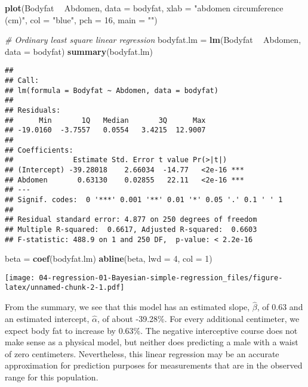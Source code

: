\documentclass[]{book}
\newenvironment{Shaded}{\begin{snugshade}}{\end{snugshade}}
\newcommand{\KeywordTok}[1]{\textcolor[rgb]{0.13,0.29,0.53}{\textbf{#1}}}
\newcommand{\DataTypeTok}[1]{\textcolor[rgb]{0.13,0.29,0.53}{#1}}
\newcommand{\DecValTok}[1]{\textcolor[rgb]{0.00,0.00,0.81}{#1}}
\newcommand{\StringTok}[1]{\textcolor[rgb]{0.31,0.60,0.02}{#1}}
\newcommand{\CommentTok}[1]{\textcolor[rgb]{0.56,0.35,0.01}{\textit{#1}}}
\newcommand{\OperatorTok}[1]{\textcolor[rgb]{0.81,0.36,0.00}{\textbf{#1}}}
\newcommand{\NormalTok}[1]{#1}
\theoremstyle{definition}
\theoremstyle{definition}
\theoremstyle{definition}
\theoremstyle{remark}
\begin{document}
\begin{Shaded}
\begin{Highlighting}[]
\KeywordTok{plot}\NormalTok{(Bodyfat }\OperatorTok{~}\StringTok{ }\NormalTok{Abdomen, }\DataTypeTok{data =}\NormalTok{ bodyfat, }
     \DataTypeTok{xlab =} \StringTok{"abdomen circumference (cm)"}\NormalTok{, }
     \DataTypeTok{col =} \StringTok{"blue"}\NormalTok{, }\DataTypeTok{pch =} \DecValTok{16}\NormalTok{, }\DataTypeTok{main =} \StringTok{""}\NormalTok{)}

\CommentTok{# Ordinary least square linear regression}
\NormalTok{bodyfat.lm =}\StringTok{ }\KeywordTok{lm}\NormalTok{(Bodyfat }\OperatorTok{~}\StringTok{ }\NormalTok{Abdomen, }\DataTypeTok{data =}\NormalTok{ bodyfat)}
\KeywordTok{summary}\NormalTok{(bodyfat.lm)}
\end{Highlighting}
\end{Shaded}

\begin{verbatim}
## 
## Call:
## lm(formula = Bodyfat ~ Abdomen, data = bodyfat)
## 
## Residuals:
##      Min       1Q   Median       3Q      Max 
## -19.0160  -3.7557   0.0554   3.4215  12.9007 
## 
## Coefficients:
##              Estimate Std. Error t value Pr(>|t|)    
## (Intercept) -39.28018    2.66034  -14.77   <2e-16 ***
## Abdomen       0.63130    0.02855   22.11   <2e-16 ***
## ---
## Signif. codes:  0 '***' 0.001 '**' 0.01 '*' 0.05 '.' 0.1 ' ' 1
## 
## Residual standard error: 4.877 on 250 degrees of freedom
## Multiple R-squared:  0.6617, Adjusted R-squared:  0.6603 
## F-statistic: 488.9 on 1 and 250 DF,  p-value: < 2.2e-16
\end{verbatim}

\begin{Shaded}
\begin{Highlighting}[]
\NormalTok{beta =}\StringTok{ }\KeywordTok{coef}\NormalTok{(bodyfat.lm)}
\KeywordTok{abline}\NormalTok{(beta, }\DataTypeTok{lwd =} \DecValTok{4}\NormalTok{, }\DataTypeTok{col =} \DecValTok{1}\NormalTok{)}
\end{Highlighting}
\end{Shaded}

\texttt{[image: 04-regression-01-Bayesian-simple-regression\_files/figure-latex/unnamed-chunk-2-1.pdf]}

From the summary, we see that this model has an estimated slope,
\(\hat{\beta}\), of 0.63 and an estimated intercept, \(\hat{\alpha}\),
of about -39.28\%. For every additional centimeter, we expect body fat
to increase by 0.63\%. The negative interceptive course does not make
sense as a physical model, but neither does predicting a male with a
waist of zero centimeters. Nevertheless, this linear regression may be
an accurate approximation for prediction purposes for measurements that
are in the observed range for this population.
\end{document}
